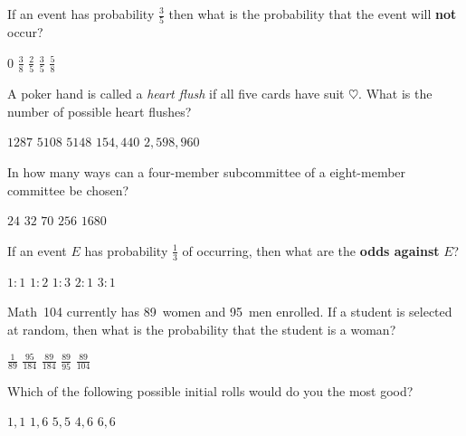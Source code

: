\documentclass[answers,12pt]{exam}
\begin{document}
\begin{questions}
\question If an event has probability $\frac{3}{5}$
then what is the probability that the event will {\bf not} occur?\\
\begin{oneparchoices}
\choice $0$
\choice $\frac{3}{8}$
\correctchoice $\frac{2}{5}$
\choice $\frac{3}{5}$
\choice $\frac{5}{8}$
\end{oneparchoices}

\question A poker hand is called a {\em heart flush}
if all five cards have suit $\heartsuit$. What is
the number of possible heart flushes?\\
\begin{oneparchoices}
\correctchoice $1287$
\choice $5108$ %
\choice $5148$ %
\choice $154,440$ %
\choice $2,598,960$ %
\end{oneparchoices}

\question In how many ways can a four-member subcommittee
of a eight-member committee be chosen?\\
\begin{oneparchoices}
\choice $24$ %
\choice $32$ %
\correctchoice $70$
\choice $256$ %
\choice $1680$ %
\end{oneparchoices}

\question If an event $E$ has probability $\frac{1}{3}$
of occurring, then what are the {\bf odds against} $E$?\\
\begin{oneparchoices}
\choice $1:1$
\choice $1:2$
\choice $1:3$
\correctchoice $2:1$
\choice $3:1$
\end{oneparchoices}

\question Math~104 currently has 89~women and 95~men enrolled.
If a student is selected at random, then what is the probability
that the student is a woman?\\
\begin{oneparchoices}
\choice $\frac{1}{89}$
\choice $\frac{95}{184}$
\correctchoice$\frac{89}{184}$
\choice $\frac{89}{95}$
\choice $\frac{89}{104}$
\end{oneparchoices}


\question\label{FirstCraps}
Which of the following possible initial rolls
would do you the most good?\\
\begin{oneparchoices}
\choice $1,1$ %
\correctchoice $1,6$
\choice $5,5$
\choice $4,6$
\choice $6,6$ %
\end{oneparchoices}


\end{questions}
\end{document}
